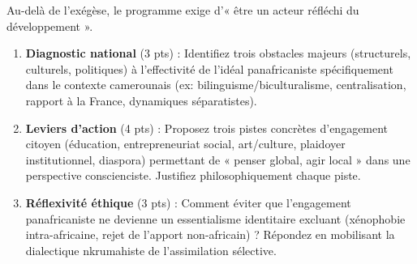 \documentclass[11pt]{article}
\begin{document}
\begin{exercice}
Au-delà de l'exégèse, le programme exige d'« être un acteur réfléchi du développement ».
\begin{enumerate}
    \item \textbf{Diagnostic national} (3 pts) : Identifiez trois obstacles majeurs (structurels, culturels, politiques) à l'effectivité de l'idéal panafricaniste spécifiquement dans le contexte camerounais (ex: bilinguisme/biculturalisme, centralisation, rapport à la France, dynamiques séparatistes).
    \item \textbf{Leviers d'action} (4 pts) : Proposez trois pistes concrètes d'engagement citoyen (éducation, entrepreneuriat social, art/culture, plaidoyer institutionnel, diaspora) permettant de « penser global, agir local » dans une perspective conscienciste. Justifiez philosophiquement chaque piste.
    \item \textbf{Réflexivité éthique} (3 pts) : Comment éviter que l'engagement panafricaniste ne devienne un essentialisme identitaire excluant (xénophobie intra-africaine, rejet de l'apport non-africain) ? Répondez en mobilisant la dialectique nkrumahiste de l'assimilation sélective.
\end{enumerate}
\end{exercice}
\end{document}
